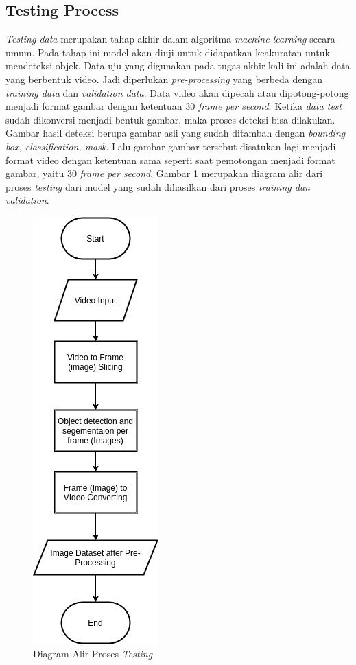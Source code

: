 \documentclass[conference]{IEEEtran}
\begin{document}
	\subsection{Testing Process}
	\vspace{1ex}
	\textit{Testing data} merupakan tahap akhir dalam algoritma \textit{machine learning} secara umum. Pada tahap ini model akan diuji untuk didapatkan keakuratan untuk mendeteksi objek. Data uju yang digunakan pada tugas akhir kali ini adalah data yang berbentuk video. Jadi diperlukan \textit{pre-processing} yang berbeda dengan \textit{training data} dan \textit{validation data}. Data video akan dipecah atau dipotong-potong menjadi format gambar dengan ketentuan 30 \textit{frame per second}. Ketika \textit{data test} sudah dikonversi menjadi bentuk gambar, maka proses deteksi bisa dilakukan. Gambar hasil deteksi berupa gambar asli yang sudah ditambah dengan \textit{bounding box, classification, mask}. Lalu gambar-gambar tersebut disatukan lagi menjadi format video dengan ketentuan sama seperti saat pemotongan menjadi format gambar, yaitu 30 \textit{frame per second}. Gambar \ref{testing} merupakan diagram alir dari proses \textit{testing} dari model yang sudah dihasilkan dari proses \textit{training dan validation}.
	
	\begin{figure}[h]
		\centering
		\includegraphics[scale=0.3]{img/testing.png}
		\caption{Diagram Alir Proses \textit{Testing}}
		\label{testing}
	\end{figure}
	
\end{document}
